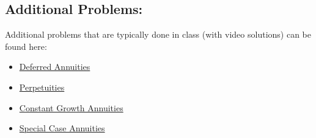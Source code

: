 \documentclass[
]{book}
\begin{document}
\subsection*{Additional Problems:}\label{additional-problems-17}

Additional problems that are typically done in class (with video solutions) can be found here:

\begin{itemize}
\item
  \href{https://theelementsmath.github.io/M114/more-on-annuities.html\#deferred-annuities}{Deferred Annuities}
\item
  \href{https://theelementsmath.github.io/M114/more-on-annuities.html\#perpetuities}{Perpetuities}
\item
  \href{https://theelementsmath.github.io/M114/more-on-annuities.html\#constant-growth-annuities}{Constant Growth Annuities}
\item
  \href{https://theelementsmath.github.io/M114/more-on-annuities.html\#special-case-annuities}{Special Case Annuities}
\end{itemize}

  
\end{document}
